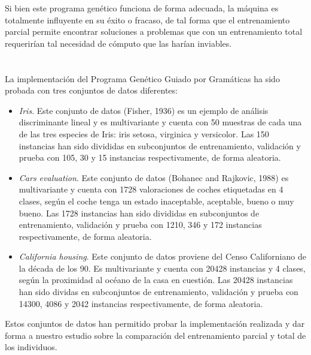 \documentclass[spanish,a4paper,12pt,twoside]{report}
\begin{document}
  Si bien este programa genético funciona de forma adecuada, la máquina es totalmente influyente en su éxito o fracaso, de tal forma que el entrenamiento parcial permite encontrar soluciones a problemas que con un entrenamiento total requerirían tal necesidad de cómputo que las harían inviables.
  
  \newpage\cleardoublepage

  \chapter{\vspace{-3cm}{\LARGE 7. Resultados}}
  \setcounter{figure}{16}
  \vspace{-1cm}
  La implementación del Programa Genético Guiado por Gramáticas ha sido probada con tres conjuntos de datos diferentes:
  \begin{itemize}
    \item \emph{Iris}. Este conjunto de datos (Fisher, 1936) es un ejemplo de análisis discriminante lineal y es multivariante y cuenta con 50 muestras de cada una de las tres especies de Iris: iris setosa, virginica y versicolor. Las 150 instancias han sido divididas en subconjuntos de entrenamiento, validación y prueba con 105, 30 y 15 instancias respectivamente, de forma aleatoria.
    \item \emph{Cars evaluation}. Este conjunto de datos (Bohanec and Rajkovic, 1988) es multivariante y cuenta con 1728 valoraciones de coches etiquetadas en 4 clases, según el coche tenga un estado inaceptable, aceptable, bueno o muy bueno. Las 1728 instancias han sido divididas en subconjuntos de entrenamiento, validación y prueba con 1210, 346 y 172 instancias respectivamente, de forma aleatoria.
    \item \emph{California housing}. Este conjunto de datos proviene del Censo Californiano de la década de los 90. Es multivariante y cuenta con 20428 instancias y 4 clases, según la proximidad al océano de la casa en cuestión. Las 20428 instancias han sido dividas en subconjuntos de entrenamiento, validación y prueba con 14300, 4086 y 2042 instancias respectivamente, de forma aleatoria.
  \end{itemize} \par
  Estos conjuntos de datos han permitido probar la implementación realizada y dar forma a nuestro estudio sobre la comparación del entrenamiento parcial y total de los individuos. \par
\end{document}
